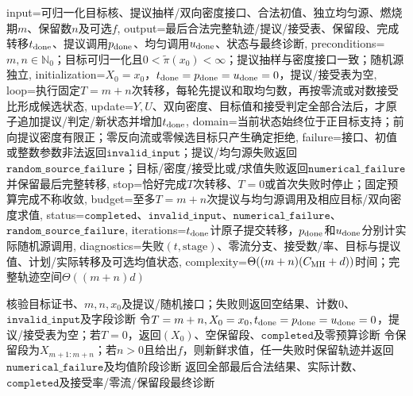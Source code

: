 \begin{AlgorithmContract}{
  input={可归一化目标核、提议抽样/双向密度接口、合法初值、独立均匀源、燃烧期$m$、保留数$n$及可选$f$},
  output={最后合法完整轨迹/提议/接受表、保留段、完成转移$t_{\rm done}$、提议调用$p_{\rm done}$、均匀调用$u_{\rm done}$、状态与最终诊断},
  preconditions={$m,n\in\mathbb N_0$；目标可归一化且$0<\widetilde\pi(x_0)<\infty$；提议抽样与密度接口一致；随机源独立},
  initialization={$X_0=x_0$，$t_{\rm done}=p_{\rm done}=u_{\rm done}=0$，提议/接受表为空},
  loop={执行固定$T=m+n$次转移，每轮先提议和取均匀数，再按零流或对数接受比形成候选状态},
  update={$Y,U$、双向密度、目标值和接受判定全部合法后，才原子追加提议/判定/新状态并增加$t_{\rm done}$},
  domain={当前状态始终位于正目标支持；前向提议密度有限正；零反向流或零候选目标只产生确定拒绝},
  failure={接口、初值或整数参数非法返回$\mathtt{invalid\_input}$；提议/均匀源失败返回$\mathtt{random\_source\_failure}$；目标/密度/接受比或$f$求值失败返回$\mathtt{numerical\_failure}$并保留最后完整转移},
  stop={恰好完成$T$次转移、$T=0$或首次失败时停止；固定预算完成不称收敛},
  budget={至多$T=m+n$次提议与均匀源调用及相应目标/双向密度求值},
  status={$\mathtt{completed}$、$\mathtt{invalid\_input}$、$\mathtt{numerical\_failure}$、$\mathtt{random\_source\_failure}$},
  iterations={$t_{\rm done}$计原子提交转移，$p_{\rm done}$和$u_{\rm done}$分别计实际随机源调用},
  diagnostics={失败$(t,\mathrm{stage})$、零流分支、接受数/率、目标与提议值、计划/实际转移及可选均值状态},
  complexity={$\Theta((m+n)(C_{\rm MH}+d))$时间；完整轨迹空间$\Theta((m+n)d)$}
}
\begin{algorithm}[tbp]
\caption{带零流分支和完整状态轨迹的一般MH}\label{alg:V5-C03-general-mh}
核验目标证书、$m,n,x_0$及提议/随机接口；失败则返回空结果、计数$0$、$\mathtt{invalid\_input}$及字段诊断\;
令$T=m+n,X_0=x_0,t_{\rm done}=p_{\rm done}=u_{\rm done}=0$，提议/接受表为空；若$T=0$，返回$(X_0)$、空保留段、$\mathtt{completed}$及零预算诊断\;
令保留段为$X_{m+1:m+n}$；若$n>0$且给出$f$，则新鲜求值，任一失败时保留轨迹并返回$\mathtt{numerical\_failure}$及均值阶段诊断\;
返回全部最后合法结果、实际计数、$\mathtt{completed}$及接受率/零流/保留段最终诊断\;
\end{algorithm}
\end{AlgorithmContract}
\endgroup

